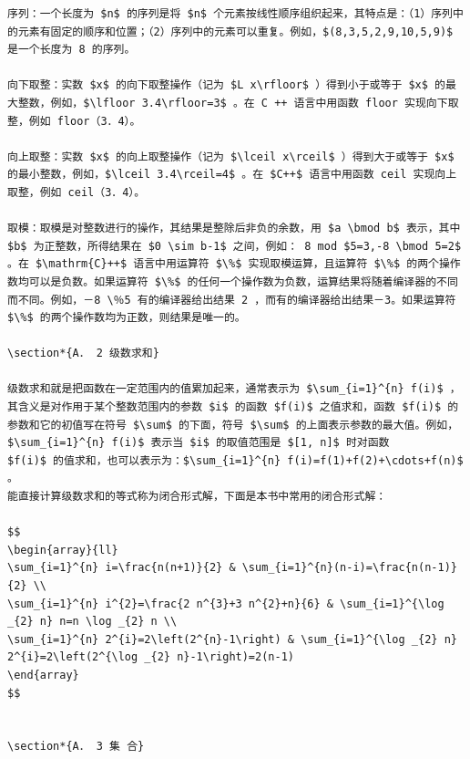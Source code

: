 \documentclass[10pt]{article}
\begin{document}
\begin{verbatim}
序列：一个长度为 $n$ 的序列是将 $n$ 个元素按线性顺序组织起来，其特点是：（1）序列中的元素有固定的顺序和位置；（2）序列中的元素可以重复。例如，$(8,3,5,2,9,10,5,9)$ 是一个长度为 8 的序列。

向下取整：实数 $x$ 的向下取整操作（记为 $L x\rfloor$ ）得到小于或等于 $x$ 的最大整数，例如，$\lfloor 3.4\rfloor=3$ 。在 C ++ 语言中用函数 floor 实现向下取整，例如 floor（3．4）。

向上取整：实数 $x$ 的向上取整操作（记为 $\lceil x\rceil$ ）得到大于或等于 $x$ 的最小整数，例如，$\lceil 3.4\rceil=4$ 。在 $C++$ 语言中用函数 ceil 实现向上取整，例如 ceil（3．4）。

取模：取模是对整数进行的操作，其结果是整除后非负的余数，用 $a \bmod b$ 表示，其中 $b$ 为正整数，所得结果在 $0 \sim b-1$ 之间，例如： 8 mod $5=3,-8 \bmod 5=2$ 。在 $\mathrm{C}++$ 语言中用运算符 $\%$ 实现取模运算，且运算符 $\%$ 的两个操作数均可以是负数。如果运算符 $\%$ 的任何一个操作数为负数，运算结果将随着编译器的不同而不同。例如，－8 \％5 有的编译器给出结果 2 ，而有的编译器给出结果－3。如果运算符 $\%$ 的两个操作数均为正数，则结果是唯一的。

\section*{A． 2 级数求和}

级数求和就是把函数在一定范围内的值累加起来，通常表示为 $\sum_{i=1}^{n} f(i)$ ，其含义是对作用于某个整数范围内的参数 $i$ 的函数 $f(i)$ 之值求和，函数 $f(i)$ 的参数和它的初值写在符号 $\sum$ 的下面，符号 $\sum$ 的上面表示参数的最大值。例如，$\sum_{i=1}^{n} f(i)$ 表示当 $i$ 的取值范围是 $[1, n]$ 时对函数
$f(i)$ 的值求和，也可以表示为：$\sum_{i=1}^{n} f(i)=f(1)+f(2)+\cdots+f(n)$ 。
能直接计算级数求和的等式称为闭合形式解，下面是本书中常用的闭合形式解：

$$
\begin{array}{ll}
\sum_{i=1}^{n} i=\frac{n(n+1)}{2} & \sum_{i=1}^{n}(n-i)=\frac{n(n-1)}{2} \\
\sum_{i=1}^{n} i^{2}=\frac{2 n^{3}+3 n^{2}+n}{6} & \sum_{i=1}^{\log _{2} n} n=n \log _{2} n \\
\sum_{i=1}^{n} 2^{i}=2\left(2^{n}-1\right) & \sum_{i=1}^{\log _{2} n} 2^{i}=2\left(2^{\log _{2} n}-1\right)=2(n-1)
\end{array}
$$


\section*{A． 3 集 合}


\end{verbatim}
\end{document}
